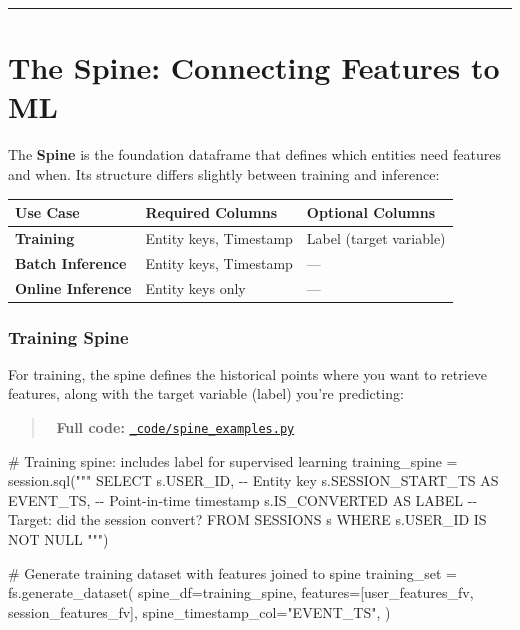 \documentclass[
  letterpaper,
  DIV=11,
  numbers=noendperiod]{scrreprt}
\newenvironment{Shaded}{\begin{snugshade}}{\end{snugshade}}
\newcommand{\CommentTok}[1]{\textcolor[rgb]{0.37,0.37,0.37}{#1}}
\newcommand{\NormalTok}[1]{\textcolor[rgb]{0.00,0.23,0.31}{#1}}
\newcommand{\OperatorTok}[1]{\textcolor[rgb]{0.37,0.37,0.37}{#1}}
\newcommand{\StringTok}[1]{\textcolor[rgb]{0.13,0.47,0.30}{#1}}
\begin{document}
\begin{center}\rule{0.5\linewidth}{0.5pt}\end{center}

\hypertarget{sec-spine}{%
\section{The Spine: Connecting Features to ML}\label{sec-spine}}

The \textbf{Spine} is the foundation dataframe that defines which
entities need features and when. Its structure differs slightly between
training and inference:

\begin{longtable}[]{@{}lll@{}}
\toprule\noalign{}
Use Case & Required Columns & Optional Columns \\
\midrule\noalign{}
\endhead
\bottomrule\noalign{}
\endlastfoot
\textbf{Training} & Entity keys, Timestamp & Label (target variable) \\
\textbf{Batch Inference} & Entity keys, Timestamp & --- \\
\textbf{Online Inference} & Entity keys only & --- \\
\end{longtable}

\hypertarget{training-spine}{%
\subsubsection{Training Spine}\label{training-spine}}

For training, the spine defines the historical points where you want to
retrieve features, along with the target variable (label) you're
predicting:

\begin{quote}
📁 \textbf{Full code:}
\href{_code/spine_examples.py}{\texttt{\_code/spine\_examples.py}}
\end{quote}

\begin{Shaded}
\begin{Highlighting}[]
\CommentTok{\# Training spine: includes label for supervised learning}
\NormalTok{training\_spine }\OperatorTok{=}\NormalTok{ session.sql(}\StringTok{"""}
\StringTok{    SELECT }
\StringTok{        s.USER\_ID,                         {-}{-} Entity key}
\StringTok{        s.SESSION\_START\_TS AS EVENT\_TS,    {-}{-} Point{-}in{-}time timestamp}
\StringTok{        s.IS\_CONVERTED AS LABEL            {-}{-} Target: did the session convert?}
\StringTok{    FROM SESSIONS s}
\StringTok{    WHERE s.USER\_ID IS NOT NULL}
\StringTok{"""}\NormalTok{)}

\CommentTok{\# Generate training dataset with features joined to spine}
\NormalTok{training\_set }\OperatorTok{=}\NormalTok{ fs.generate\_dataset(}
\NormalTok{    spine\_df}\OperatorTok{=}\NormalTok{training\_spine,}
\NormalTok{    features}\OperatorTok{=}\NormalTok{[user\_features\_fv, session\_features\_fv],}
\NormalTok{    spine\_timestamp\_col}\OperatorTok{=}\StringTok{"EVENT\_TS"}\NormalTok{,}
\NormalTok{)}
\end{Highlighting}
\end{Shaded}
\end{document}
